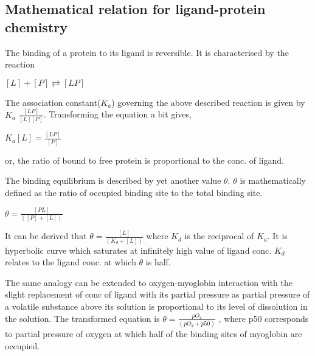 \documentclass[12pt]{article}
\begin{document}
\subsection{Mathematical relation for ligand-protein chemistry}
The binding of a protein to its ligand is reversible. It is characterised by the reaction 
\begin{center}
$[L]+[P]\rightleftarrows [LP]$
\end{center}
The association constant($K_{a}$) governing the above described reaction is given by $ K_{a}$ $\frac{[LP]}{[L][P]}$.
Transforming the equation a bit gives,
\begin{center}
$K_{a}[L]=\frac{[LP]}{[P]}$
\end{center}
or, the ratio of bound to free protein is proportional to the conc. of ligand.

The binding equilibrium is described by yet another value $\theta$. $\theta$ is mathematically defined as the ratio of occupied binding site to the total binding site.
\begin{center}
$ \theta= \frac{[PL]}{([P]+[L])}$
\end{center}
It can be derived that $ \theta= \frac{[L]}{(K_{d}+[L])}$   where $K_{d}$ is the reciprocal of $K_{a}$. It is hyperbolic curve which saturates at infinitely high value of ligand conc. $K_{d}$ relates to the ligand conc. at which $\theta$ is half.

The same analogy can be extended to oxygen-myoglobin interaction with the slight replacement of conc of ligand with its partial pressure as partial pressure of a volatile substance above its solution is proportional to its level of dissolution in the solution.
The transformed equation is $\theta= \frac{pO_{2}}{(pO_{2}+p50)}$ , where p50 corresponds to partial pressure of oxygen at which half of the binding sites of myoglobin are occupied.
\end{document}
